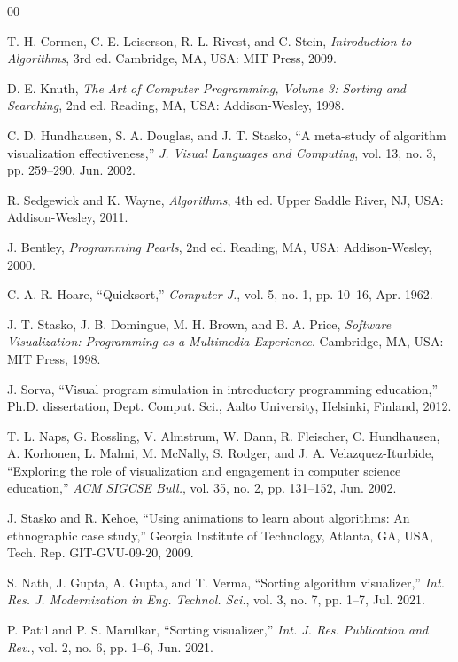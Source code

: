 \documentclass[conference]{IEEEtran}
\begin{document}
\begin{thebibliography}{00}

T. H. Cormen, C. E. Leiserson, R. L. Rivest, and C. Stein,
\textit{Introduction to Algorithms}, 3rd ed.
Cambridge, MA, USA: MIT Press, 2009.

D. E. Knuth,
\textit{The Art of Computer Programming, Volume 3: Sorting and Searching},
2nd ed. Reading, MA, USA: Addison-Wesley, 1998.

C. D. Hundhausen, S. A. Douglas, and J. T. Stasko,
``A meta-study of algorithm visualization effectiveness,''
\textit{J. Visual Languages and Computing},
vol. 13, no. 3, pp. 259--290, Jun. 2002.

R. Sedgewick and K. Wayne,
\textit{Algorithms}, 4th ed.
Upper Saddle River, NJ, USA: Addison-Wesley, 2011.

J. Bentley,
\textit{Programming Pearls}, 2nd ed.
Reading, MA, USA: Addison-Wesley, 2000.

C. A. R. Hoare,
``Quicksort,''
\textit{Computer J.},
vol. 5, no. 1, pp. 10--16, Apr. 1962.

J. T. Stasko, J. B. Domingue, M. H. Brown, and B. A. Price,
\textit{Software Visualization: Programming as a Multimedia Experience}.
Cambridge, MA, USA: MIT Press, 1998.

J. Sorva,
``Visual program simulation in introductory programming education,''
Ph.D. dissertation, Dept. Comput. Sci., Aalto University,
Helsinki, Finland, 2012.

T. L. Naps, G. Rossling, V. Almstrum, W. Dann, R. Fleischer,
C. Hundhausen, A. Korhonen, L. Malmi, M. McNally, S. Rodger, and
J. A. Velazquez-Iturbide,
``Exploring the role of visualization and engagement in computer science
education,''
\textit{ACM SIGCSE Bull.},
vol. 35, no. 2, pp. 131--152, Jun. 2002.

J. Stasko and R. Kehoe,
``Using animations to learn about algorithms: An ethnographic case study,''
Georgia Institute of Technology, Atlanta, GA, USA,
Tech. Rep. GIT-GVU-09-20, 2009.

S. Nath, J. Gupta, A. Gupta, and T. Verma,
``Sorting algorithm visualizer,''
\textit{Int. Res. J. Modernization in Eng. Technol. Sci.},
vol. 3, no. 7, pp. 1--7, Jul. 2021.

P. Patil and P. S. Marulkar,
``Sorting visualizer,''
\textit{Int. J. Res. Publication and Rev.},
vol. 2, no. 6, pp. 1--6, Jun. 2021.


\end{thebibliography}
\end{document}
